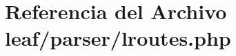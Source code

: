 \hypertarget{lroutes_8php}{\section{Referencia del Archivo leaf/parser/lroutes.php}
\label{lroutes_8php}
}
